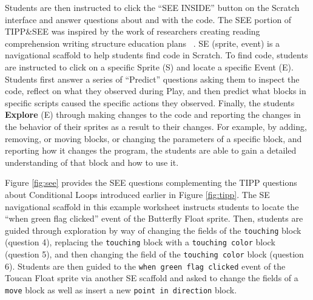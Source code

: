 \documentclass[sigconf,manuscript,review,anonymous]{acmart} %
\def\ts{TIPP\&SEE}
\begin{document}
Students are then instructed to click the ``SEE INSIDE'' button on the Scratch interface and answer questions about and with the code. The SEE portion of \ts{} was inspired by the work of researchers creating reading comprehension writing structure education plans ~\cite{sdymock}. SE (sprite, event) is a navigational scaffold to help students find code in Scratch. To find code, students are instructed to click on a specific Sprite (S) and locate a specific Event (E). Students first answer a series of ``Predict'' questions asking them to inspect the code, reflect on what they observed during Play, and then predict what blocks in specific scripts caused the specific actions they observed. %
Finally, the students \textbf{Explore} (E) through making changes to the code and reporting the changes in the behavior of their sprites as a result to their changes. For example, by adding, removing, or moving blocks, or changing the parameters of a specific block, and reporting how it changes the program, the students are able to gain a detailed understanding of that block and how to use it. 

Figure \ref{fig:see} provides the SEE questions complementing the TIPP questions about Conditional Loops introduced earlier in Figure \ref{fig:tipp}. The SE navigational scaffold in this example worksheet instructs students to locate the ``when green flag clicked'' event of the Butterfly Float sprite. Then, students are guided through exploration by way of changing the fields of the \texttt{touching} block (question 4), replacing the \texttt{touching} block with a \texttt{touching color} block (question 5), and then changing the field of the \texttt{touching color} block (question 6). Students are then guided to the \texttt{when green flag clicked} event of the Toucan Float sprite via another SE scaffold and asked to change the fields of a \texttt{move} block as well as insert a new \texttt{point in direction} block.
\end{document}
